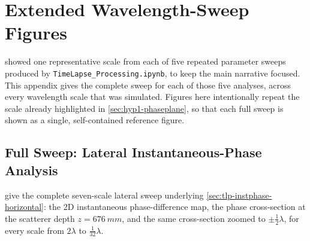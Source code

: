 \chapter{Extended Wavelength-Sweep Figures}
\label{app:extended-sweeps}

 showed one representative scale from each of five
repeated parameter sweeps produced by \texttt{TimeLapse\_Processing.ipynb},
to keep the main narrative focused. This appendix gives the complete sweep
for each of those five analyses, across every wavelength scale that was
simulated. Figures here intentionally repeat the scale already highlighted
in \cref{sec:hyp1-phaseplane}, so that each full sweep is shown as a single,
self-contained reference figure.

\section{Full Sweep: Lateral Instantaneous-Phase Analysis}
\label{app:sec-instphase-horizontal}

give the complete seven-scale lateral sweep underlying
\cref{sec:tlp-instphase-horizontal}: the 2D instantaneous phase-difference
map, the phase cross-section at the scatterer depth $z=\SI{676}{mm}$, and
the same cross-section zoomed to $\pm\tfrac12\lambda$, for every scale from
$2\lambda$ to $\tfrac{1}{32}\lambda$.

